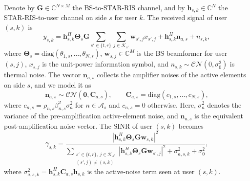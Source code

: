\documentclass[journal]{IEEEtran}
\begin{document}
Denote by $\mathbf{G}\in\mathbb{C}^{N\times M}$ the BS-to-STAR-RIS channel, and by $\mathbf{h}_{s,k}\in\mathbb{C}^N$ the STAR-RIS-to-user channel on side $s$ for user $k$. The received signal of user $(s,k)$ is
\begin{equation}
y_{s,k}=\mathbf{h}_{s,k}^H\mathbf{\Theta}_s\mathbf{G}
\sum_{s'\in\{t,r\}}\sum_{j\in\mathcal{K}_{s'}}\mathbf{w}_{s',j}x_{s',j}
+\mathbf{h}_{s,k}^H\mathbf{n}_{a,s}+n_{s,k},
\label{eq:received}
\end{equation}
where $\mathbf{\Theta}_s=\mathrm{diag}(\theta_{1,s},\ldots,\theta_{N,s})$, $\mathbf{w}_{s,j}\in\mathbb{C}^{M}$ is the BS beamformer for user $(s,j)$, $x_{s,j}$ is the unit-power information symbol, and $n_{s,k}\sim\mathcal{CN}(0,\sigma_0^2)$ is thermal noise. The vector $\mathbf{n}_{a,s}$ collects the amplifier noises of the active elements on side $s$, and we model it as \cite{zhang2022signal,ma2023activeee}
\begin{equation}
\mathbf{n}_{a,s}\sim\mathcal{CN}(\mathbf{0},\mathbf{C}_{a,s}),\qquad
\mathbf{C}_{a,s}=\mathrm{diag}(c_{1,s},\ldots,c_{N,s}),
\label{eq:na_stat}
\end{equation}
where $c_{n,s}=\rho_{n,s}\beta_{n,s}^2\sigma_a^2$ for $n\in\mathcal{A}_s$ and $c_{n,s}=0$ otherwise. Here, $\sigma_a^2$ denotes the variance of the pre-amplification active-element noise, and $\mathbf{n}_{a,s}$ is the equivalent post-amplification noise vector. The SINR of user $(s,k)$ becomes
\begin{equation}
\gamma_{s,k}=
\frac{\left|\mathbf{h}_{s,k}^H\mathbf{\Theta}_s\mathbf{G}\mathbf{w}_{s,k}\right|^2}
{\sum_{\substack{s'\in\{t,r\},\ j\in\mathcal{K}_{s'}\\(s',j)\ne(s,k)}}
\left|\mathbf{h}_{s,k}^H\mathbf{\Theta}_s\mathbf{G}\mathbf{w}_{s',j}\right|^2
+\sigma_{a,s,k}^2+\sigma_0^2},
\label{eq:sinr_full}
\end{equation}
where $\sigma_{a,s,k}^2=\mathbf{h}_{s,k}^H\mathbf{C}_{a,s}\mathbf{h}_{s,k}$ is the active-noise term seen at user $(s,k)$.
\end{document}
